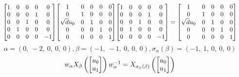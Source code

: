 \documentclass[11pt]{article}
\theoremstyle{definition}
\begin{document}
\[
\scaletoalign{\textwidth}{{\left[\begin{matrix}1 & 0 & 0 & 0 & 0\\0 & 0 & 0 & 1 & 0\\0 & 0 & 1 & 0 & 0\\0 & 1 & 0 & 0 & 0\\0 & 0 & 0 & 0 & -1\end{matrix}\right]} {\left[\begin{matrix}1 & 0 & 0 & 0 & 0\\0 & 1 & 0 & 0 & 0\\\sqrt{d} u_{0} & 0 & 1 & 0 & 0\\0 & 0 & 0 & 1 & 0\\0 & 0 & 0 & 0 & 1\end{matrix}\right]} {\left[\begin{matrix}1 & 0 & 0 & 0 & 0\\0 & 0 & 0 & 1 & 0\\0 & 0 & 1 & 0 & 0\\0 & 1 & 0 & 0 & 0\\0 & 0 & 0 & 0 & -1\end{matrix}\right]} = {\left[\begin{matrix}1 & 0 & 0 & 0 & 0\\0 & 1 & 0 & 0 & 0\\\sqrt{d} u_{0} & 0 & 1 & 0 & 0\\0 & 0 & 0 & 1 & 0\\0 & 0 & 0 & 0 & 1\end{matrix}\right]}}
\]
\[
\alpha = \left( 0, \  -2, \  0, \  0, \  0\right), \beta = \left( -1, \  -1, \  0, \  0, \  0\right), \sigma_{\alpha}(\beta) = \left( -1, \  1, \  0, \  0, \  0\right)
\]
\[
\scaletoalign{\textwidth}{w_{\alpha} X_{\beta}\left(\left[\begin{matrix}u_{0}\\u_{1}\end{matrix}\right]\right) w_{\alpha}^{-1} = X_{\sigma_{\alpha}\left(\beta\right)}\left(\left[\begin{matrix}u_{0}\\u_{1}\end{matrix}\right]\right)}
\]
\end{document}
